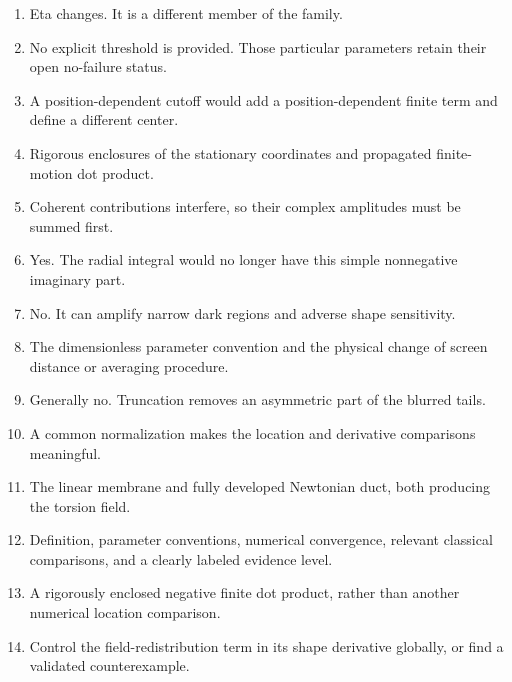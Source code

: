 \documentclass[11pt,oneside,openany]{book}
\begin{document}
\begin{enumerate}

\item Eta changes. It is a different member of the family.

\item No explicit threshold is provided. Those particular parameters retain their open no-failure status.

\item A position-dependent cutoff would add a position-dependent finite term and define a different center.

\item Rigorous enclosures of the stationary coordinates and propagated finite-motion dot product.

\item Coherent contributions interfere, so their complex amplitudes must be summed first.

\item Yes. The radial integral would no longer have this simple nonnegative imaginary part.

\item No. It can amplify narrow dark regions and adverse shape sensitivity.

\item The dimensionless parameter convention and the physical change of screen distance or averaging procedure.

\item Generally no. Truncation removes an asymmetric part of the blurred tails.

\item A common normalization makes the location and derivative comparisons meaningful.

\item The linear membrane and fully developed Newtonian duct, both producing the torsion field.

\item Definition, parameter conventions, numerical convergence, relevant classical comparisons, and a clearly labeled evidence level.

\item A rigorously enclosed negative finite dot product, rather than another numerical location comparison.

\item Control the field-redistribution term in its shape derivative globally, or find a validated counterexample.

\end{enumerate}
\end{document}
